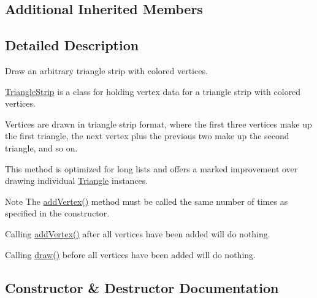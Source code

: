 \subsection*{Additional Inherited Members}


\subsection{Detailed Description}
Draw an arbitrary triangle strip with colored vertices. 

\hyperlink{classtsgl_1_1_triangle_strip}{Triangle\+Strip} is a class for holding vertex data for a triangle strip with colored vertices.

Vertices are drawn in triangle strip format, where the first three vertices make up the first triangle, the next vertex plus the previous two make up the second triangle, and so on.

This method is optimized for long lists and offers a marked improvement over drawing individual \hyperlink{classtsgl_1_1_triangle}{Triangle} instances. \begin{DoxyNote}{Note}
The \hyperlink{classtsgl_1_1_shape_ac0ea13ecde43ce62262f82597fb94755}{add\+Vertex()} method must be called the same number of times as specified in the constructor. 

Calling \hyperlink{classtsgl_1_1_shape_ac0ea13ecde43ce62262f82597fb94755}{add\+Vertex()} after all vertices have been added will do nothing. 

Calling \hyperlink{classtsgl_1_1_shape_ae0905e73f1652d92cef9c7f2c38572f3}{draw()} before all vertices have been added will do nothing. 
\end{DoxyNote}


\subsection{Constructor \& Destructor Documentation}
\mbox{\label{classtsgl_1_1_triangle_strip_adea2ae457f504be5369f83d0b2852755}} 
